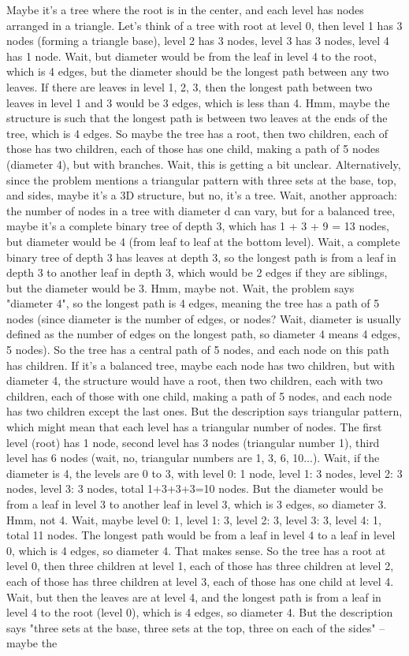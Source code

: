 Maybe it's a tree where the root is in the center, and each level has nodes arranged in a triangle. Let's think of a tree with root at level 0, then level 1 has 3 nodes (forming a triangle base), level 2 has 3 nodes, level 3 has 3 nodes, level 4 has 1 node. Wait, but diameter would be from the leaf in level 4 to the root, which is 4 edges, but the diameter should be the longest path between any two leaves. If there are leaves in level 1, 2, 3, then the longest path between two leaves in level 1 and 3 would be 3 edges, which is less than 4. Hmm, maybe the structure is such that the longest path is between two leaves at the ends of the tree, which is 4 edges. So maybe the tree has a root, then two children, each of those has two children, each of those has one child, making a path of 5 nodes (diameter 4), but with branches. Wait, this is getting a bit unclear. Alternatively, since the problem mentions a triangular pattern with three sets at the base, top, and sides, maybe it's a 3D structure, but no, it's a tree. Wait, another approach: the number of nodes in a tree with diameter d can vary, but for a balanced tree, maybe it's a complete binary tree of depth 3, which has 1 + 3 + 9 = 13 nodes, but diameter would be 4 (from leaf to leaf at the bottom level). Wait, a complete binary tree of depth 3 has leaves at depth 3, so the longest path is from a leaf in depth 3 to another leaf in depth 3, which would be 2 edges if they are siblings, but the diameter would be 3. Hmm, maybe not. Wait, the problem says "diameter 4", so the longest path is 4 edges, meaning the tree has a path of 5 nodes (since diameter is the number of edges, or nodes? Wait, diameter is usually defined as the number of edges on the longest path, so diameter 4 means 4 edges, 5 nodes). So the tree has a central path of 5 nodes, and each node on this path has children. If it's a balanced tree, maybe each node has two children, but with diameter 4, the structure would have a root, then two children, each with two children, each of those with one child, making a path of 5 nodes, and each node has two children except the last ones. But the description says triangular pattern, which might mean that each level has a triangular number of nodes. The first level (root) has 1 node, second level has 3 nodes (triangular number 1), third level has 6 nodes (wait, no, triangular numbers are 1, 3, 6, 10...). Wait, if the diameter is 4, the levels are 0 to 3, with level 0: 1 node, level 1: 3 nodes, level 2: 3 nodes, level 3: 3 nodes, total 1+3+3+3=10 nodes. But the diameter would be from a leaf in level 3 to another leaf in level 3, which is 3 edges, so diameter 3. Hmm, not 4. Wait, maybe level 0: 1, level 1: 3, level 2: 3, level 3: 3, level 4: 1, total 11 nodes. The longest path would be from a leaf in level 4 to a leaf in level 0, which is 4 edges, so diameter 4. That makes sense. So the tree has a root at level 0, then three children at level 1, each of those has three children at level 2, each of those has three children at level 3, each of those has one child at level 4. Wait, but then the leaves are at level 4, and the longest path is from a leaf in level 4 to the root (level 0), which is 4 edges, so diameter 4. But the description says "three sets at the base, three sets at the top, three on each of the sides" – maybe the 